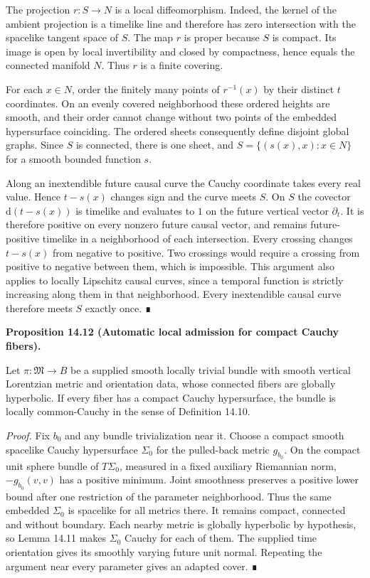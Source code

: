 \documentclass[
  english,
  11pt,
  reqno]{amsart}
\makeatletter
\newcommand{\pandocstatementheading}[1]{%
  \par\if@nobreak\else
    \addpenalty{\@beginparpenalty}%
    \addvspace{.5\baselineskip plus .2\baselineskip minus .2\baselineskip}%
  \fi
  {\normalfont\bfseries #1\par}%
  \nobreak\@afterindenttrue\@afterheading
}
\makeatother
\begin{document}
The projection \(r:S\to N\) is a local diffeomorphism. Indeed, the
kernel of the ambient projection is a timelike line and therefore has
zero intersection with the spacelike tangent space of \(S\). The map
\(r\) is proper because \(S\) is compact. Its image is open by local
invertibility and closed by compactness, hence equals the connected
manifold \(N\). Thus \(r\) is a finite covering.

For each \(x\in N\), order the finitely many points of \(r^{-1}(x)\) by
their distinct \(t\) coordinates. On an evenly covered neighborhood
these ordered heights are smooth, and their order cannot change without
two points of the embedded hypersurface coinciding. The ordered sheets
consequently define disjoint global graphs. Since \(S\) is connected,
there is one sheet, and \(S=\{(s(x),x):x\in N\}\) for a smooth bounded
function \(s\).

Along an inextendible future causal curve the Cauchy coordinate takes
every real value. Hence \(t-s(x)\) changes sign and the curve meets
\(S\). On \(S\) the covector \(\mathrm d(t-s(x))\) is timelike and
evaluates to \(1\) on the future vertical vector \(\partial_t\). It is
therefore positive on every nonzero future causal vector, and remains
future-positive timelike in a neighborhood of each intersection. Every
crossing changes \(t-s(x)\) from negative to positive. Two crossings
would require a crossing from positive to negative between them, which
is impossible. This argument also applies to locally Lipschitz causal
curves, since a temporal function is strictly increasing along them in
that neighborhood. Every inextendible causal curve therefore meets \(S\)
exactly once. ∎

\pandocstatementheading{\protect{}\label{prop:compact-fibers-local-cauchy-admission}Proposition 14.12 (Automatic local admission for compact Cauchy fibers).}

Let \(\pi:\mathfrak M\to B\) be a supplied smooth locally trivial bundle
with smooth vertical Lorentzian metric and orientation data, whose
connected fibers are globally hyperbolic. If every fiber has a compact
Cauchy hypersurface, the bundle is locally common-Cauchy in the sense of
Definition 14.10.

\emph{Proof.} Fix \(b_0\) and any bundle trivialization near it. Choose
a compact smooth spacelike Cauchy hypersurface \(\Sigma_0\) for the
pulled-back metric \(g_{b_0}\). On the compact unit sphere bundle of
\(T\Sigma_0\), measured in a fixed auxiliary Riemannian norm,
\(-g_{b_0}(v,v)\) has a positive minimum. Joint smoothness preserves a
positive lower bound after one restriction of the parameter
neighborhood. Thus the same embedded \(\Sigma_0\) is spacelike for all
metrics there. It remains compact, connected and without boundary. Each
nearby metric is globally hyperbolic by hypothesis, so Lemma 14.11 makes
\(\Sigma_0\) Cauchy for each of them. The supplied time orientation
gives its smoothly varying future unit normal. Repeating the argument
near every parameter gives an adapted cover. ∎
\end{document}
